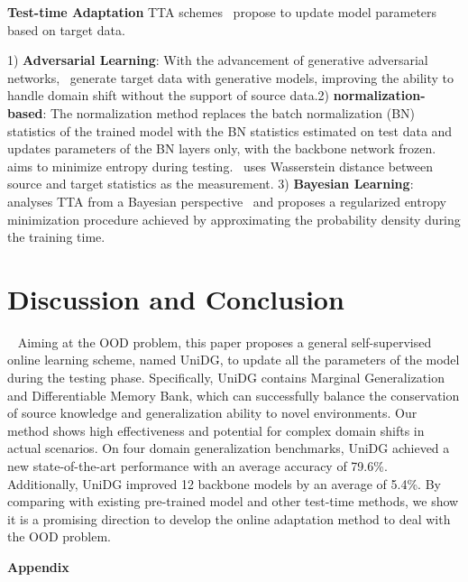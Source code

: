 \documentclass{article} \usepackage{iclr2024_conference,times}
\def\Model{UniDG }
\begin{document}
\textbf{Test-time Adaptation} TTA schemes~\citep{karani2021test,iwasawa2021test,sun2020test,park2023test} propose to update model parameters based on target data. 

1) \textbf{Adversarial Learning}: With the advancement of generative adversarial networks,~\cite{li2020model,yeh2021sofa,kurmi2021domain} generate target data with generative models, improving the ability to handle domain shift without the support of source data.2) \textbf{normalization-based}: The normalization method replaces the batch normalization (BN) statistics of the trained model with the BN statistics estimated on test data and updates parameters of the BN layers only, with the backbone network frozen.~\cite{wang2020tent} aims to minimize entropy during testing.~\cite{schneider2020improving} uses Wasserstein distance between source and target statistics as the measurement.
3) \textbf{Bayesian Learning}: \cite{zhou2021training} analyses TTA from a Bayesian perspective~\citep{li2016revisiting,hu2021mixnorm,you2021test} and proposes a regularized entropy minimization procedure achieved by approximating the probability density during the training time.



\section{Discussion and Conclusion } ~\label{sec:conclusion}
Aiming at the OOD problem, this paper proposes a general self-supervised online learning scheme, named UniDG, to update all the parameters of the model during the testing phase. Specifically, \Model contains Marginal Generalization and Differentiable Memory Bank, which can successfully balance the conservation of source knowledge and generalization ability to novel environments. Our method shows high effectiveness and potential for complex domain shifts in actual scenarios. On four domain generalization benchmarks, \Model achieved a new state-of-the-art performance with an average accuracy of 79.6\%. Additionally, \Model improved 12 backbone models by an average of 5.4\%. By comparing with existing pre-trained model and other test-time methods, we show it is a promising direction to develop the online adaptation method to deal with the OOD problem.




\clearpage
\appendix
{\Large\textbf{Appendix}}
\end{document}
